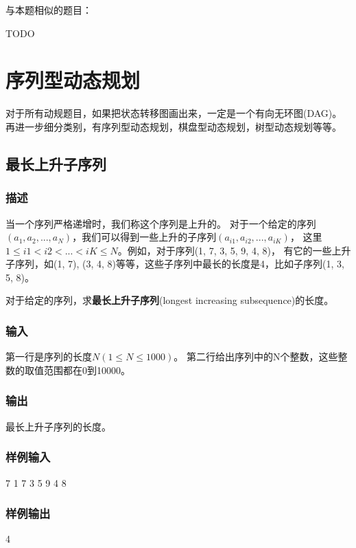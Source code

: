 与本题相似的题目：
\begindot
\item TODO
\myenddot


\section{序列型动态规划} %
对于所有动规题目，如果把状态转移图画出来，一定是一个有向无环图(DAG)。再进一步细分类别，有序列型动态规划，棋盘型动态规划，树型动态规划等等。


\subsection{最长上升子序列}

\subsubsection{描述}
当一个序列严格递增时，我们称这个序列是上升的。
对于一个给定的序列$(a_1, a_2, ..., a_N)$，我们可以得到一些上升的子序列$(a_{i1}, a_{i2}, ..., a_{iK})$，
这里$1 \leq i1 < i2 < ... < iK \leq N$。例如，对于序列(1, 7, 3, 5, 9, 4, 8)，
有它的一些上升子序列，如(1, 7), (3, 4, 8)等等，这些子序列中最长的长度是4，比如子序列(1, 3, 5, 8)。

对于给定的序列，求\textbf{最长上升子序列}(longest increasing subsequence)的长度。

\subsubsection{输入}
第一行是序列的长度$N (1 \leq N \leq 1000)$。
第二行给出序列中的N个整数，这些整数的取值范围都在0到10000。

\subsubsection{输出}
最长上升子序列的长度。

\subsubsection{样例输入}
\begin{Code}
7
1 7 3 5 9 4 8
\end{Code}

\subsubsection{样例输出}
\begin{Code}
4
\end{Code}

